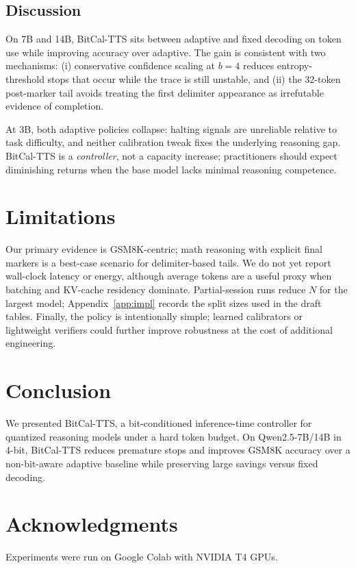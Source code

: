 \documentclass[11pt]{article}
\begin{document}
\subsection{Discussion}
On 7B and 14B, BitCal-TTS sits between adaptive and fixed decoding on token use while improving accuracy over adaptive. The gain is consistent with two mechanisms: (i) conservative confidence scaling at $b{=}4$ reduces entropy-threshold stops that occur while the trace is still unstable, and (ii) the 32-token post-marker tail avoids treating the first delimiter appearance as irrefutable evidence of completion.

At 3B, both adaptive policies collapse: halting signals are unreliable relative to task difficulty, and neither calibration tweak fixes the underlying reasoning gap. BitCal-TTS is a \emph{controller}, not a capacity increase; practitioners should expect diminishing returns when the base model lacks minimal reasoning competence.

\section{Limitations}
Our primary evidence is GSM8K-centric; math reasoning with explicit final markers is a best-case scenario for delimiter-based tails. We do not yet report wall-clock latency or energy, although average tokens are a useful proxy when batching and KV-cache residency dominate. Partial-session runs reduce $N$ for the largest model; Appendix~\ref{app:impl} records the split sizes used in the draft tables. Finally, the policy is intentionally simple; learned calibrators or lightweight verifiers could further improve robustness at the cost of additional engineering.

\section{Conclusion}
We presented BitCal-TTS, a bit-conditioned inference-time controller for quantized reasoning models under a hard token budget. On Qwen2.5-7B/14B in 4-bit, BitCal-TTS reduces premature stops and improves GSM8K accuracy over a non-bit-aware adaptive baseline while preserving large savings versus fixed decoding.

\section*{Acknowledgments}
Experiments were run on Google Colab with NVIDIA T4 GPUs.
\end{document}
